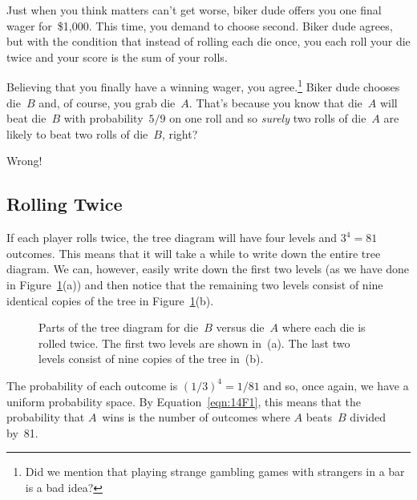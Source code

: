 Just when you think matters can't get worse, biker dude offers you one
final wager for~\$1,000.  This time, you demand to choose second.
Biker dude agrees, but with the condition that instead of rolling each
die once, you each roll your die twice and your score is the sum of
your rolls.

Believing that you finally have a winning wager, you
agree.\footnote{Did we mention that playing strange gambling games
  with strangers in a bar is a bad idea?}  Biker dude chooses die~$B$
and, of course, you grab die~$A$.  That's because you know that
die~$A$ will beat die~$B$ with probability~$5/9$ on one roll and so
\emph{surely} two rolls of die~$A$ are likely to beat two rolls of
die~$B$, right?

Wrong!

\subsection{Rolling Twice}

If each player rolls twice, the tree diagram will have four levels and
$3^4 = 81$ outcomes.  This means that it will take a while to write
down the entire tree diagram.  We can, however, easily write down the
first two levels (as we have done in Figure~\ref{fig:14A11}(a)) and
then notice that the remaining two levels consist of nine identical
copies of the tree in Figure~\ref{fig:14A11}(b).

\begin{figure}


\caption{Parts of the tree diagram for die~$B$ versus die~$A$ where
  each die is rolled twice.  The first two levels are shown in~(a).
  The last two levels consist of nine copies of the tree in~(b).}

\label{fig:14A11}

\end{figure}

The probability of each outcome is $(1/3)^4 = 1/81$ and so, once
again, we have a uniform probability space.  By
Equation~\ref{eqn:14F1}, this means that the probability that $A$~wins
is the number of outcomes where $A$ beats~$B$ divided by~81.

